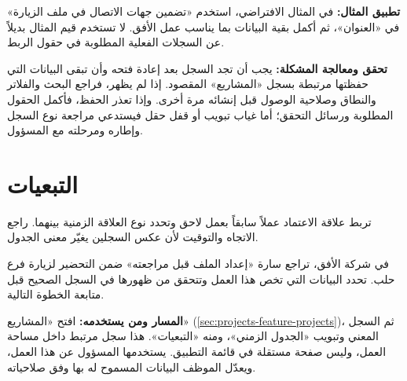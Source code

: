 \textbf{تطبيق المثال:} في المثال الافتراضي، استخدم «تضمين جهات الاتصال في ملف الزيارة» في «العنوان»، ثم أكمل بقية البيانات بما يناسب عمل الأفق. لا تستخدم قيم المثال بديلاً عن السجلات الفعلية المطلوبة في حقول الربط.

\textbf{تحقق ومعالجة المشكلة:} يجب أن تجد السجل بعد إعادة فتحه وأن تبقى البيانات التي حفظتها مرتبطة بسجل «المشاريع» المقصود. إذا لم يظهر، فراجع البحث والفلاتر والنطاق وصلاحية الوصول قبل إنشائه مرة أخرى. وإذا تعذر الحفظ، فأكمل الحقول المطلوبة ورسائل التحقق؛ أما غياب تبويب أو قفل حقل فيستدعي مراجعة نوع السجل وإطاره ومرحلته مع المسؤول.

\clearpage
\section{التبعيات}
\label{sec:projects-feature-dependencies}

تربط علاقة الاعتماد عملاً سابقاً بعمل لاحق وتحدد نوع العلاقة الزمنية بينهما. راجع الاتجاه والتوقيت لأن عكس السجلين يغيّر معنى الجدول.

\begin{rcnote}
في شركة الأفق، تراجع سارة «إعداد الملف قبل مراجعته» ضمن التحضير لزيارة فرع حلب. تحدد البيانات التي تخص هذا العمل وتتحقق من ظهورها في السجل الصحيح قبل متابعة الخطوة التالية.
\end{rcnote}

\textbf{المسار ومن يستخدمه:} افتح «المشاريع» (\ref{sec:projects-feature-projects})، ثم السجل المعني وتبويب «الجدول الزمني»، ومنه «التبعيات». هذا سجل مرتبط داخل مساحة العمل، وليس صفحة مستقلة في قائمة التطبيق. يستخدمها المسؤول عن هذا العمل، ويعدّل الموظف البيانات المسموح له بها وفق صلاحياته.

